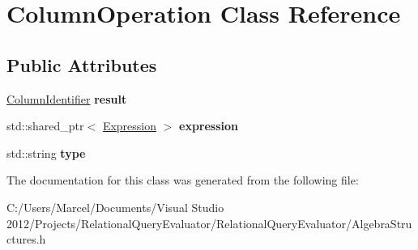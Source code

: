 \hypertarget{class_column_operation}{\section{Column\+Operation Class Reference}
\label{class_column_operation}
}
\subsection*{Public Attributes}
\begin{DoxyCompactItemize}
\item 
\hypertarget{class_column_operation_aab22c48d83db533c5b153136a4da6db7}{\hyperlink{class_column_identifier}{Column\+Identifier} {\bfseries result}}\label{class_column_operation_aab22c48d83db533c5b153136a4da6db7}

\item 
\hypertarget{class_column_operation_a4d5d373009098230cb3a2bfa3aa3cc33}{std\+::shared\+\_\+ptr$<$ \hyperlink{class_expression}{Expression} $>$ {\bfseries expression}}\label{class_column_operation_a4d5d373009098230cb3a2bfa3aa3cc33}

\item 
\hypertarget{class_column_operation_ae04fd07588173c74291e80032f80f991}{std\+::string {\bfseries type}}\label{class_column_operation_ae04fd07588173c74291e80032f80f991}

\end{DoxyCompactItemize}


The documentation for this class was generated from the following file\+:\begin{DoxyCompactItemize}
\item 
C\+:/\+Users/\+Marcel/\+Documents/\+Visual Studio 2012/\+Projects/\+Relational\+Query\+Evaluator/\+Relational\+Query\+Evaluator/Algebra\+Structures.\+h\end{DoxyCompactItemize}
